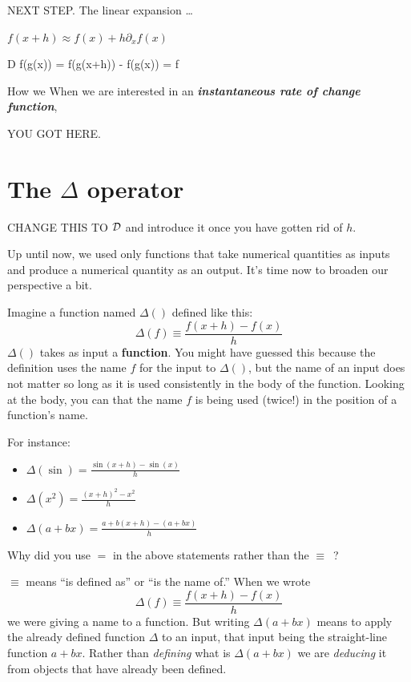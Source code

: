 \documentclass[
]{book}
\providecommand{\tightlist}{%
  \setlength{\itemsep}{0pt}\setlength{\parskip}{0pt}}
\begin{document}
NEXT STEP. The linear expansion \ldots{}

\(f(x + h) \approx f(x) + h \partial_x f(x)\)

D f(g(x)) = f(g(x+h)) - f(g(x)) = f

How we
When we are interested in an \textbf{\emph{instantaneous rate of change function}},

YOU GOT HERE.

\hypertarget{the-delta-operator}{%
\section{\texorpdfstring{The \(\Delta\) operator}{The \textbackslash Delta operator}}\label{the-delta-operator}}

CHANGE THIS TO \({\cal D}\) and introduce it once you have gotten rid of \(h\).

Up until now, we used only functions that take numerical quantities as inputs and produce a numerical quantity as an output. It's time now to broaden our perspective a bit.

Imagine a function named \(\Delta()\) defined like this:
\[\Delta(f) \equiv \frac{f(x+h) - f(x)}{h}\]
\(\Delta()\) takes as input a \textbf{function}. You might have guessed this because the definition uses the name \(f\) for the input to \(\Delta()\), but the name of an input does not matter so long as it is used consistently in the body of the function. Looking at the body, you can that the name \(f\) is being used (twice!) in the position of a function's name.

For instance:

\begin{itemize}
\tightlist
\item
  \(\Delta(\sin) = \frac{\sin(x+h) - \sin(x)}{h}\)
\item
  \(\Delta(x^2) = \frac{(x+h)^2 - x^2}{h}\)
\item
  \(\Delta(a + b x) = \frac{a + b(x + h) - \left(a + b x\right)}{h}\)
\end{itemize}

Why did you use \(=\) in the above statements rather than the \(\equiv\)~?

\(\equiv\) means ``is defined as'' or ``is the name of.'' When we wrote \[\Delta(f) \equiv \frac{f(x+h) - f(x)}{h}\] we were giving a name to a function. But writing \(\Delta(a + b x)\) means to apply the already defined function \(\Delta\) to an input, that input being the straight-line function \(a + b x\). Rather than \emph{defining} what is \(\Delta(a + b x)\) we are \emph{deducing} it from objects that have already been defined.
\end{document}
